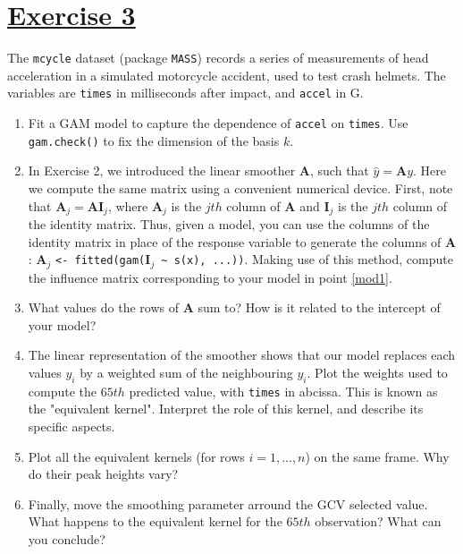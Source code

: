 \documentclass[a4paper,12pt]{article}\usepackage[]{graphicx}\usepackage[]{color}
\begin{document}
\section*{\underline{Exercise 3}}

The \verb"mcycle" dataset (package \verb"MASS") records a series of measurements of head acceleration in a simulated motorcycle accident, used to test crash helmets. The variables are \verb"times" in milliseconds after impact, and \verb"accel" in G.

\begin{enumerate}

\item{Fit a GAM model to capture the dependence of \verb"accel" on \verb"times". Use \verb"gam.check()" to fix the dimension of the basis $k$. \label{mod1}}

\item{In Exercise 2, we introduced the linear smoother $\mathbf{A}$, such that $\widehat{y} = \mathbf{A} y$. Here we compute the same matrix using a convenient numerical device. First, note that $\mathbf{A}_j = \mathbf{A} \mathbf{I}_j$, where $\mathbf{A}_j$ is the $jth$ column of $\mathbf{A}$ and $\mathbf{I}_j$ is the $jth$ column of the identity matrix. Thus, given a model, you can use the columns of the identity matrix in place of the response variable to generate the columns of $\mathbf{A}$:
$\mathbf{A}_j$ \verb"<- fitted(gam("$\mathbf{I}_j$\verb" ~ s(x), ...))". Making use of this method, compute the influence matrix corresponding to your model in point \ref{mod1}.}

\item{What values do the rows of $\mathbf{A}$ sum to? How is it related to the intercept of your model?}

\item{The linear representation of the smoother shows that our model replaces each values $y_i$ by a weighted sum of the
neighbouring $y_i$. Plot the weights used to compute the $65th$ predicted value, with \verb"times" in abcissa. This is known as the "equivalent kernel". Interpret the role of this kernel, and describe its specific aspects.}

\item{Plot all the equivalent kernels (for rows $i = 1,...,n$) on the same frame. Why do their peak heights vary?}

\item{Finally, move the smoothing parameter arround the GCV selected value. What happens to the equivalent kernel for the $65th$ observation? What can you conclude?}

\end{enumerate}
\end{document}
